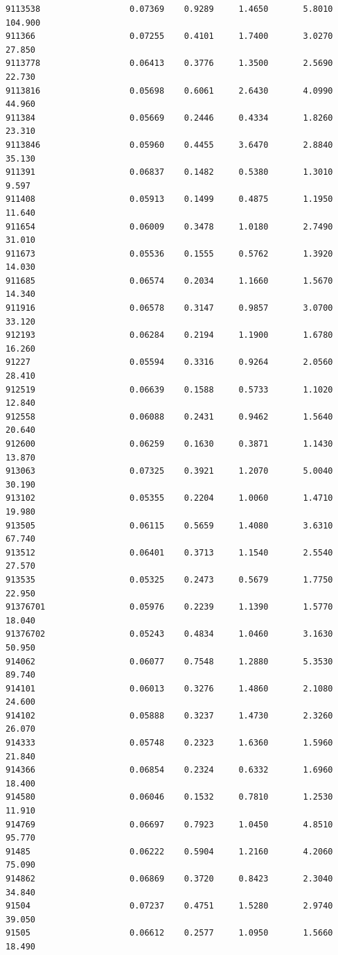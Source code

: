 \documentclass[
  letterpaper,
  DIV=11,
  numbers=noendperiod]{scrartcl}
\begin{document}
\begin{verbatim}
9113538                  0.07369    0.9289     1.4650       5.8010 104.900
911366                   0.07255    0.4101     1.7400       3.0270  27.850
9113778                  0.06413    0.3776     1.3500       2.5690  22.730
9113816                  0.05698    0.6061     2.6430       4.0990  44.960
911384                   0.05669    0.2446     0.4334       1.8260  23.310
9113846                  0.05960    0.4455     3.6470       2.8840  35.130
911391                   0.06837    0.1482     0.5380       1.3010   9.597
911408                   0.05913    0.1499     0.4875       1.1950  11.640
911654                   0.06009    0.3478     1.0180       2.7490  31.010
911673                   0.05536    0.1555     0.5762       1.3920  14.030
911685                   0.06574    0.2034     1.1660       1.5670  14.340
911916                   0.06578    0.3147     0.9857       3.0700  33.120
912193                   0.06284    0.2194     1.1900       1.6780  16.260
91227                    0.05594    0.3316     0.9264       2.0560  28.410
912519                   0.06639    0.1588     0.5733       1.1020  12.840
912558                   0.06088    0.2431     0.9462       1.5640  20.640
912600                   0.06259    0.1630     0.3871       1.1430  13.870
913063                   0.07325    0.3921     1.2070       5.0040  30.190
913102                   0.05355    0.2204     1.0060       1.4710  19.980
913505                   0.06115    0.5659     1.4080       3.6310  67.740
913512                   0.06401    0.3713     1.1540       2.5540  27.570
913535                   0.05325    0.2473     0.5679       1.7750  22.950
91376701                 0.05976    0.2239     1.1390       1.5770  18.040
91376702                 0.05243    0.4834     1.0460       3.1630  50.950
914062                   0.06077    0.7548     1.2880       5.3530  89.740
914101                   0.06013    0.3276     1.4860       2.1080  24.600
914102                   0.05888    0.3237     1.4730       2.3260  26.070
914333                   0.05748    0.2323     1.6360       1.5960  21.840
914366                   0.06854    0.2324     0.6332       1.6960  18.400
914580                   0.06046    0.1532     0.7810       1.2530  11.910
914769                   0.06697    0.7923     1.0450       4.8510  95.770
91485                    0.06222    0.5904     1.2160       4.2060  75.090
914862                   0.06869    0.3720     0.8423       2.3040  34.840
91504                    0.07237    0.4751     1.5280       2.9740  39.050
91505                    0.06612    0.2577     1.0950       1.5660  18.490

\end{verbatim}
\end{document}
